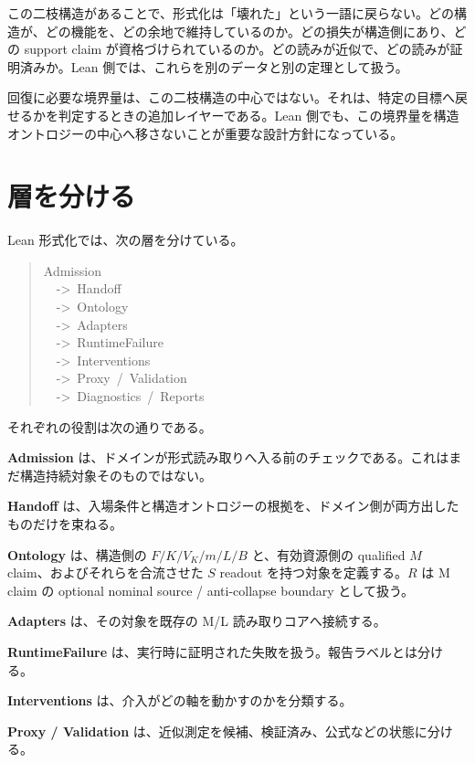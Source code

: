 \documentclass[12pt,a4paper]{article}
\begin{document}
この二枝構造があることで、形式化は「壊れた」という一語に戻らない。どの構造が、どの機能を、どの余地で維持しているのか。どの損失が構造側にあり、どの support claim が資格づけられているのか。どの読みが近似で、どの読みが証明済みか。Lean 側では、これらを別のデータと別の定理として扱う。

回復に必要な境界量は、この二枝構造の中心ではない。それは、特定の目標へ戻せるかを判定するときの追加レイヤーである。Lean 側でも、この境界量を構造オントロジーの中心へ移さないことが重要な設計方針になっている。

\section{層を分ける}\label{ux5c64ux3092ux5206ux3051ux308b}

Lean 形式化では、次の層を分けている。

\begin{quote}
{\small\ttfamily\noindent
Admission \\~~->~Handoff \\~~->~Ontology \\~~->~Adapters \\~~->~RuntimeFailure \\~~->~Interventions \\~~->~Proxy~/~Validation \\~~->~Diagnostics~/~Reports
}
\end{quote}

それぞれの役割は次の通りである。

\textbf{Admission} は、ドメインが形式読み取りへ入る前のチェックである。これはまだ構造持続対象そのものではない。

\textbf{Handoff} は、入場条件と構造オントロジーの根拠を、ドメイン側が両方出したものだけを束ねる。

\textbf{Ontology} は、構造側の \(F/K/V_K/m/L/B\) と、有効資源側の qualified \(M\) claim、およびそれらを合流させた \(S\) readout を持つ対象を定義する。\(R\) は M claim の optional nominal source / anti-collapse boundary として扱う。

\textbf{Adapters} は、その対象を既存の M/L 読み取りコアへ接続する。

\textbf{RuntimeFailure} は、実行時に証明された失敗を扱う。報告ラベルとは分ける。

\textbf{Interventions} は、介入がどの軸を動かすのかを分類する。

\textbf{Proxy / Validation} は、近似測定を候補、検証済み、公式などの状態に分ける。
\end{document}
